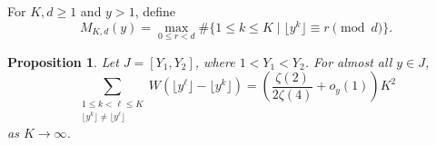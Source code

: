 \documentclass[11pt,reqno]{amsart}
\numberwithin{equation}{section}
\newtheorem{proposition}[theorem]{Proposition}
\begin{document}
    For $K,d\ge1$ and $y>1$, define
    $$
    M_{K,d}(y)=\max_{0\le r<d}
    \#\{1\le k\le K\mid \lfloor y^k\rfloor\equiv r\pmod d\}.
    $$

    \begin{proposition}\label{prop-metric}
        Let $J=[Y_1,Y_2]$, where $1<Y_1<Y_2$. For almost all $y\in J$,
        \begin{equation}\label{eq-pair-asymptotic}
            \sum_{\substack{1\le k<\ell\le K\\
                    \lfloor y^k\rfloor\ne\lfloor y^\ell\rfloor}}
            W\!\left(\lfloor y^\ell\rfloor-\lfloor y^k\rfloor\right)
            =\left(\frac{\zeta(2)}{2\zeta(4)}+o_y(1)\right)K^2
        \end{equation}
        as $K\to\infty$.
    \end{proposition}
\end{document}
